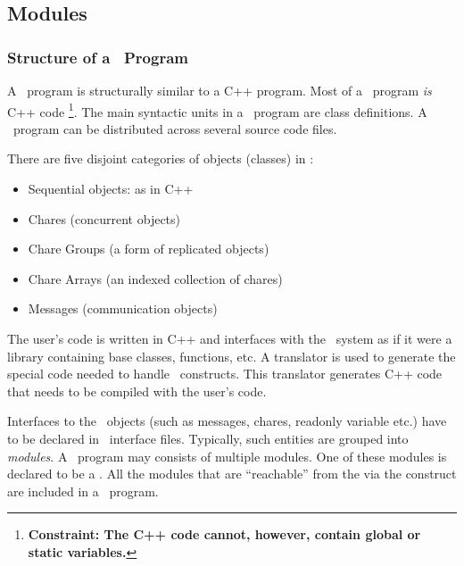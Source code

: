\subsection{Modules}

\subsubsection{Structure of a \charmpp\ Program}

A \charmpp\ program is structurally similar to a C++ program.  Most of
a \charmpp\ program {\em is} C++ code
\footnote{\bf Constraint: The C++ code cannot, however,
contain global or static variables.}. The main syntactic units in a
\charmpp\ program are class definitions. A \charmpp\ program can
be distributed across several source code files.

There are five disjoint categories of objects (classes) in \charmpp:
\begin{itemize}
\item Sequential objects: as in C++
\item Chares (concurrent objects) 
\item Chare Groups  (a form of replicated objects)
\item Chare Arrays  (an indexed collection of chares)
\item Messages (communication objects)
\end{itemize}

The user's code is written in C++ and interfaces with the \charmpp\
system as if it were a library containing base classes, functions, etc.
A translator is used to generate the special code needed to handle
\charmpp\ constructs.  This translator generates C++ code that needs
to be compiled with the user's code.

Interfaces to the \charmpp\ objects (such as messages, chares, readonly 
variable etc.) \index{message}\index{chare}\index{readonly}
have to be declared in \charmpp\ interface files. Typically, such entities 
are grouped \index{module}
into {\em modules}. A \charmpp\ program may consists of multiple modules. 
One of these modules
is declared to be a . All the modules that are
``reachable'' from the \kw{mainmodule} via the  construct
are included in a \charmpp\ program.

